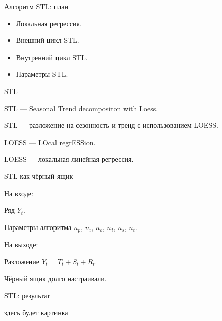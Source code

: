 
\begin{frame} %


\end{frame}



\begin{frame}{Алгоритм STL: план}
  \begin{itemize}[<+->]
    \item Локальная регрессия.
    \item Внешний цикл STL.
    \item Внутренний цикл STL.
    \item Параметры STL.
  \end{itemize}

\end{frame}


\begin{frame}{STL}

  \alert{STL} — Seasonal Trend decompositon with Loess.
  
  STL — разложение на сезонность и тренд с использованием LOESS.
  
  \pause
  
  \alert{LOESS} — LOcal regrESSion.
  
  LOESS — локальная линейная регрессия. 
  
\end{frame}


\begin{frame}{STL как чёрный ящик}

\alert{На входе:}

Ряд $Y_t$.

Параметры алгоритма $n_p$, $n_i$, $n_o$, $n_l$, $n_s$, $n_t$.

\pause
\alert{На выходе:}

Разложение $Y_t = T_t + S_t + R_t$.

\pause

Чёрный ящик \alert{долго} настраивали. 

\end{frame}


\begin{frame}{STL: результат}

  здесь будет картинка

\end{frame}

